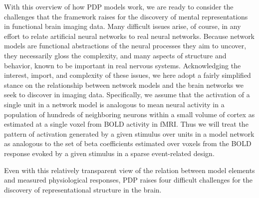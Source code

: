With this overview of how PDP models work, we are ready to consider the challenges that the framework raises for the discovery of mental representations in functional brain imaging data. Many difficult issues arise, of course, in any effort to relate artificial neural networks to real neural networks. Because network models are functional abstractions of the neural processes they aim to uncover, they necessarily gloss the complexity, and many aspects of structure and behavior, known to be important in real nervous systems. Acknowledging the interest, import, and complexity of these issues, we here adopt a fairly simplified stance on the relationship between network models and the brain networks we seek to discover in imaging data. Specifically, we assume that the activation of a single unit in a network model is analogous to mean neural activity in a population of hundreds of neighboring neurons within a small volume of cortex as estimated at a single voxel from BOLD activity in fMRI. Thus we will treat the pattern of activation generated by a given stimulus over units in a model network as analogous to the set of beta coefficients estimated over voxels from the BOLD response evoked by a given stimulus in a sparse event-related design. 

Even with this relatively transparent view of the relation between model elements and measured physiological responses, PDP raises four difficult challenges for the discovery of representational structure in the brain.

